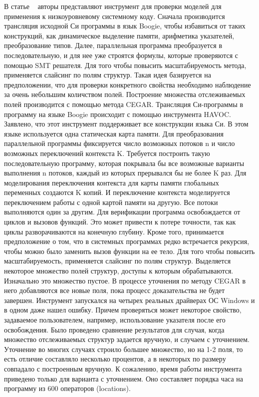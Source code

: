 В статье ~\cite{Lahiri:2009} авторы представляют инструмент для проверки моделей для применения к низкоуровневому системному коду. Сначала производится трансляция исходной Си программы в язык Boogie, чтобы избавиться от таких конструкций, как динамическое выделение памяти, арифметика указателей, преобразование типов. Далее, параллельная программа преобразуется в последовательную, и для нее уже строятся формулы, которые проверяются с помощью SMT решателя. Для того чтобы повысить масштабируемость метода, применяется слайсинг по полям структур. Такая идея базируется на предположении, что для проверки конкретного свойства необходимо наблюдение за очень небольшим количством полей. Построение множества отслеживаемых полей производится с помощью метода CEGAR. 
Трансляция Си-программы в программу на языке Boogie происходит с помощью инструмента HAVOC. Заявлено, что этот инструмент поддерживает все конструкции языка Си. В этом языке используется одна статическая карта памяти. 
Для преобразования параллельной программы фиксируется число возможных потоков n и число возможных переключений контекста K. Требуется построить такую последовательную программу, которая покрывала бы все возможные варианты выполнения n потоков, каждый из которых прерывался бы не более K раз. Для моделирования переключения контекста для карты памяти глобальных переменных создаются K копий. И переключение контекста моделируется переключением работы с одной картой памяти на другую. Все потоки выполняются один за другим. 
Для верификации программа освобождается от циклов и вызовов функций. Это может привести к потере точности, так как циклы разворачиваются на конечную глубину. Кроме того, принимается предположение о том, что в системных программах редко встречается рекурсия, чтобы можно было заменить вызов функции на ее тело. Для того чтобы повысить масштабируемость, применяется слайсинг по полям структур. Выделяется некоторое множество полей структур, доступы к которым обрабатываются. Изначально это множество пустое. В процессе уточнения по методу CEGAR в него добавляются все новые поля, пока процесс доказательства не будет завершен. 
Инструмент запускался на четырех реальных драйверах ОС Windows и в одном даже нашел ошибку. Причем проверяться может некоторое свойство, задаваемое пользователем, например, использование указателя после его освобождения. Было проведено сравнение результатов для случая, когда множество отслеживаемых структур задается вручную, и случаем с уточнением. Уточнение во многих случаях строило большее множество, но на 1-2 поля, то есть отличие составляло несколько процентов, а в некоторых по размеру совпадало с построенным вручную. К сожалению, время работы инструмента приведено только для варианта с уточнением. Оно составляет порядка часа на программу из 600 операторов (locations). 

